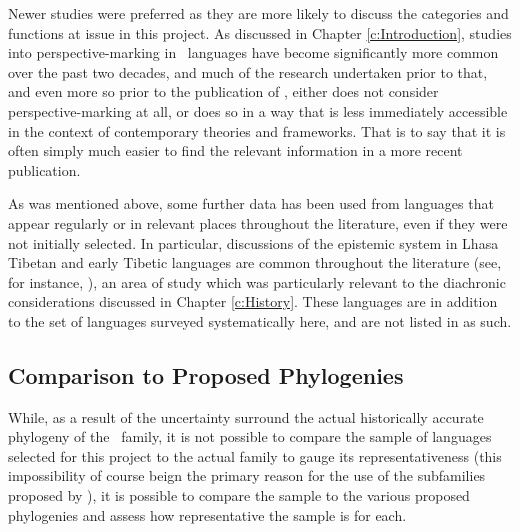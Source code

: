 Newer studies were preferred as they are more likely to discuss the categories and functions at issue in this project. As discussed in Chapter \ref{c:Introduction}, studies into perspective-marking in \lfam\ languages have become significantly more common over the past two decades, and much of the research undertaken prior to that, and even more so prior to the publication of , either does not consider perspective-marking at all, or does so in a way that is less immediately accessible in the context of contemporary theories and frameworks. That is to say that it is often simply much easier to find the relevant information in a more recent publication.

As was mentioned above, some further data has been used from languages that appear regularly or in relevant places throughout the literature, even if they were not initially selected. In particular, discussions of the epistemic system in Lhasa Tibetan and early Tibetic languages are common throughout the literature (see, for instance, ), an area of study which was particularly relevant to the diachronic considerations discussed in Chapter \ref{c:History}. These languages are in addition to the set of languages surveyed systematically here, and are not listed in  as such.

\subsection{Comparison to Proposed Phylogenies}\label{ss:Methods:Bayesian}
While, as a result of the uncertainty surround the actual historically accurate phylogeny of the \lfam\ family, it is not possible to compare the sample of languages selected for this project to the actual family to gauge its representativeness (this impossibility of course beign the primary reason for the use of the subfamilies proposed by ), it is possible to compare the sample to the various proposed phylogenies and assess how representative the sample is for each.

